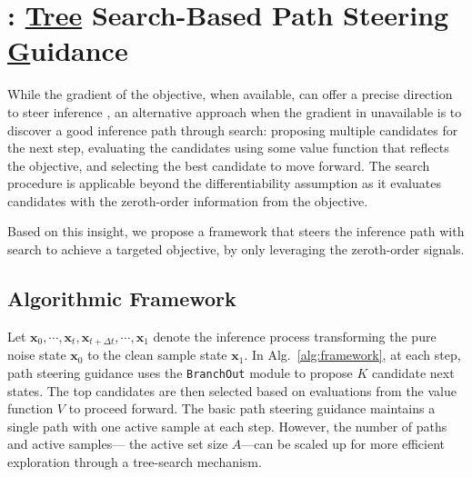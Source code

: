 \section{\ouralg: \underline{Tree} Search-Based Path Steering \underline{G}uidance}
\label{sec:propose sps}

While the gradient of the objective, when available, can offer a precise direction to steer inference \citep{guo2024gradient}, an alternative approach when the gradient in unavailable is to discover a good inference path through search: proposing multiple candidates for the next step, evaluating the candidates using some value function that reflects the objective, and selecting the best candidate to move forward. The search procedure is applicable beyond the differentiability assumption as it evaluates candidates with the zeroth-order information from the objective. 

Based on this insight, we propose a framework that steers the inference path with search to achieve a targeted objective, by only leveraging the zeroth-order signals. 

\subsection{Algorithmic Framework}
Let $\boldsymbol{x}_0, \cdots, \boldsymbol{x}_t, \boldsymbol{x}_{t+\Delta t}, \cdots, \boldsymbol{x}_1$ denote the inference process transforming the pure noise state $\boldsymbol{x}_0$ to the clean sample state $\boldsymbol{x}_1$. In Alg.~\ref{alg:framework}, at each step, path steering guidance uses the \texttt{BranchOut} module to propose $K$ candidate next states. The top candidates are then selected based on evaluations from the value function $V$ to proceed forward. The basic path steering guidance maintains a single path with one active sample at each step. However, the number of paths and active samples— the active set size $A$—can be scaled up for more efficient exploration through a tree-search mechanism.






